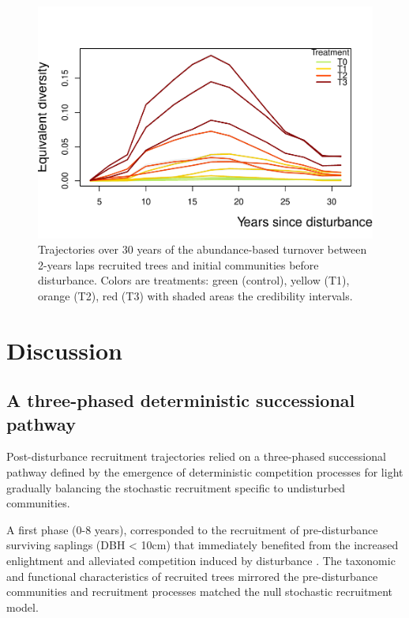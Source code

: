 \documentclass[fleqn,10pt]{ArtEcoFoG} %
\begin{document}
\begin{figure}

{\centering \includegraphics[width=1\linewidth]{RecruitmentTrajectories_files/figure-latex/Turnover-1} 

}

\caption{Trajectories over 30 years of the abundance-based turnover between 2-years laps recruited trees and initial communities before disturbance. Colors are treatments: green (control), yellow (T1), orange (T2), red (T3) with shaded areas the credibility intervals.}\label{fig:Turnover}
\end{figure}

\section{Discussion}\label{discussion}

\subsection{A three-phased deterministic successional
pathway}\label{a-three-phased-deterministic-successional-pathway}

Post-disturbance recruitment trajectories relied on a three-phased
successional pathway defined by the emergence of deterministic
competition processes for light gradually balancing the stochastic
recruitment specific to undisturbed communities.

A first phase (0-8 years), corresponded to the recruitment of
pre-disturbance surviving saplings (DBH \textless{} 10cm) that
immediately benefited from the increased enlightment and alleviated
competition induced by disturbance \citep{Denslow2000, Herault2010}. The
taxonomic and functional characteristics of recruited trees mirrored the
pre-disturbance communities and recruitment processes matched the null
stochastic recruitment model.
\end{document}

